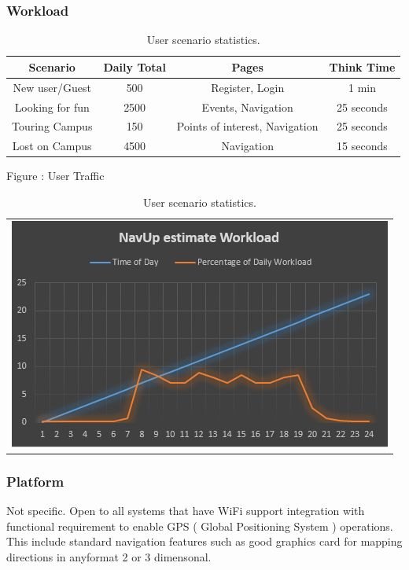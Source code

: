 \documentclass[a4paper,12pt]{report}
\begin{document}
		\subsubsection{Workload}
		\begin{table}[h!]
			\centering
			\caption{User scenario statistics.}
			\label{tab:table1}
			\begin{tabular}{|c|c|c|c|}
				 \hline
				Scenario & Daily Total & Pages & Think Time \\
				\hline
				New user/Guest & 500 & Register, Login & 1 min \\
				\hline
				Looking for fun & 2500 & Events, Navigation & 25 seconds\\
				\hline
				Touring Campus & 150 & Points of interest, Navigation & 25 seconds \\
				\hline
				Lost on Campus & 4500 & Navigation & 15 seconds\\
				\hline
			\end{tabular}
			
			\bigskip
			Figure : User Traffic \\
			\begin{tabular}{l}
				
				\includegraphics{workLoad.png}
				
			\end{tabular}
		
		\end{table}
	
		
		\subsubsection{Platform}
		 Not specific. Open to all systems that have WiFi support integration with functional requirement to enable 
		 GPS ( Global Positioning System ) operations. This include standard navigation features such as good graphics 
		 card for mapping directions in anyformat 2 or 3 dimensonal. 
\end{document}
